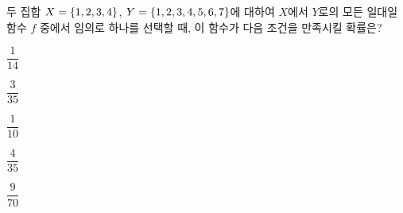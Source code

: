 두 집합 $X=\{1{,}\mkern3mu\mathopen{}2{,}\mkern3mu\mathopen{}3{,}\mkern3mu\mathopen{}4\}$, $Y=\{1{,}\mkern3mu\mathopen{}2{,}\mkern3mu\mathopen{}3{,}\mkern3mu\mathopen{}4{,}\mkern3mu\mathopen{}5{,}\mkern3mu\mathopen{}6{,}\mkern3mu\mathopen{}7\}$에 대하여 $X$에서 $Y$로의 모든 일대일함수 $f$ 중에서 임의로 하나를 선택할 때, 이 함수가 다음 조건을 만족시킬 확률은? 
\begin{choices32}{\rule[-3ex]{0pt}{8ex}$\dfrac{1}{14}$}{\rule[-3ex]{0pt}{8ex}$\dfrac{3}{35}$}{\rule[-3ex]{0pt}{8ex}$\dfrac{1}{10}$}{\rule[-3ex]{0pt}{8ex}$\dfrac{4}{35}$}{\rule[-3ex]{0pt}{8ex}$\dfrac{9}{70}$}\end{choices32}

